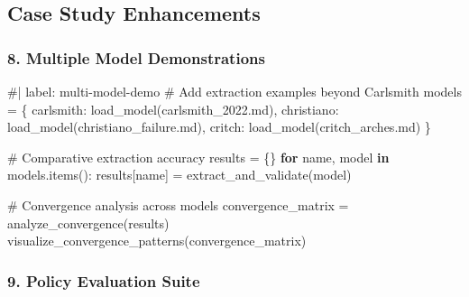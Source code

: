 \documentclass[
  11pt,
  letterpaper,
]{book}
\newenvironment{Shaded}{\begin{snugshade}}{\end{snugshade}}
\newcommand{\CommentTok}[1]{\textcolor[rgb]{0.37,0.37,0.37}{#1}}
\newcommand{\ControlFlowTok}[1]{\textcolor[rgb]{0.00,0.23,0.31}{\textbf{#1}}}
\newcommand{\KeywordTok}[1]{\textcolor[rgb]{0.00,0.23,0.31}{\textbf{#1}}}
\newcommand{\NormalTok}[1]{\textcolor[rgb]{0.00,0.23,0.31}{#1}}
\newcommand{\OperatorTok}[1]{\textcolor[rgb]{0.37,0.37,0.37}{#1}}
\newcommand{\StringTok}[1]{\textcolor[rgb]{0.13,0.47,0.30}{#1}}
\begin{document}
\subsection{Case Study Enhancements}\label{case-study-enhancements}

\subsubsection{8. Multiple Model
Demonstrations}\label{multiple-model-demonstrations}

\begin{Shaded}
\begin{Highlighting}[]
\CommentTok{\#| label: multi{-}model{-}demo}
\CommentTok{\# Add extraction examples beyond Carlsmith}
\NormalTok{models }\OperatorTok{=}\NormalTok{ \{}
    \StringTok{\textquotesingle{}carlsmith\textquotesingle{}}\NormalTok{: load\_model(}\StringTok{\textquotesingle{}carlsmith\_2022.md\textquotesingle{}}\NormalTok{),}
    \StringTok{\textquotesingle{}christiano\textquotesingle{}}\NormalTok{: load\_model(}\StringTok{\textquotesingle{}christiano\_failure.md\textquotesingle{}}\NormalTok{),}
    \StringTok{\textquotesingle{}critch\textquotesingle{}}\NormalTok{: load\_model(}\StringTok{\textquotesingle{}critch\_arches.md\textquotesingle{}}\NormalTok{)}
\NormalTok{\}}

\CommentTok{\# Comparative extraction accuracy}
\NormalTok{results }\OperatorTok{=}\NormalTok{ \{\}}
\ControlFlowTok{for}\NormalTok{ name, model }\KeywordTok{in}\NormalTok{ models.items():}
\NormalTok{    results[name] }\OperatorTok{=}\NormalTok{ extract\_and\_validate(model)}
    
\CommentTok{\# Convergence analysis across models}
\NormalTok{convergence\_matrix }\OperatorTok{=}\NormalTok{ analyze\_convergence(results)}
\NormalTok{visualize\_convergence\_patterns(convergence\_matrix)}
\end{Highlighting}
\end{Shaded}

\subsubsection{9. Policy Evaluation
Suite}\label{policy-evaluation-suite}
\end{document}
